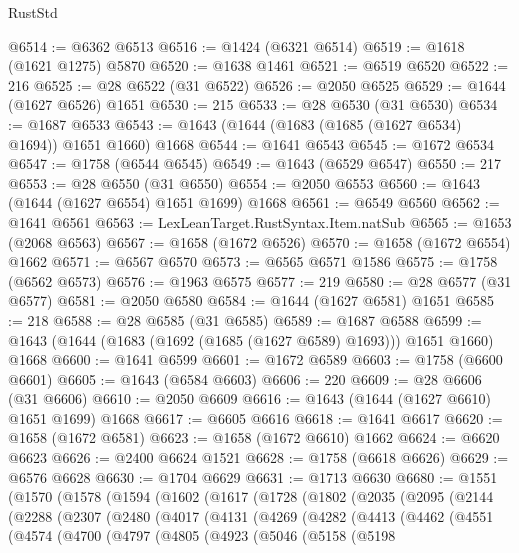 \begin{lexlean}{RustStd}
\begin{coremodule}
@6514 := @6362 @6513
@6516 := @1424 (@6321 @6514)
@6519 := @1618 (@1621 @1275) @5870
@6520 := @1638 @1461
@6521 := @6519 @6520
@6522 := 216
@6525 := @28 @6522 (@31 @6522)
@6526 := @2050 @6525
@6529 := @1644 (@1627 @6526) @1651
@6530 := 215
@6533 := @28 @6530 (@31 @6530)
@6534 := @1687 @6533
@6543 := @1643 (@1644 (@1683 (@1685 (@1627 @6534) @1694)) @1651 @1660) @1668
@6544 := @1641 @6543
@6545 := @1672 @6534
@6547 := @1758 (@6544 @6545)
@6549 := @1643 (@6529 @6547)
@6550 := 217
@6553 := @28 @6550 (@31 @6550)
@6554 := @2050 @6553
@6560 := @1643 (@1644 (@1627 @6554) @1651 @1699) @1668
@6561 := @6549 @6560
@6562 := @1641 @6561
@6563 := LexLeanTarget.RustSyntax.Item.natSub
@6565 := @1653 (@2068 @6563)
@6567 := @1658 (@1672 @6526)
@6570 := @1658 (@1672 @6554) @1662
@6571 := @6567 @6570
@6573 := @6565 @6571 @1586
@6575 := @1758 (@6562 @6573)
@6576 := @1963 @6575
@6577 := 219
@6580 := @28 @6577 (@31 @6577)
@6581 := @2050 @6580
@6584 := @1644 (@1627 @6581) @1651
@6585 := 218
@6588 := @28 @6585 (@31 @6585)
@6589 := @1687 @6588
@6599 := @1643 (@1644 (@1683 (@1692 (@1685 (@1627 @6589) @1693))) @1651 @1660) @1668
@6600 := @1641 @6599
@6601 := @1672 @6589
@6603 := @1758 (@6600 @6601)
@6605 := @1643 (@6584 @6603)
@6606 := 220
@6609 := @28 @6606 (@31 @6606)
@6610 := @2050 @6609
@6616 := @1643 (@1644 (@1627 @6610) @1651 @1699) @1668
@6617 := @6605 @6616
@6618 := @1641 @6617
@6620 := @1658 (@1672 @6581)
@6623 := @1658 (@1672 @6610) @1662
@6624 := @6620 @6623
@6626 := @2400 @6624 @1521
@6628 := @1758 (@6618 @6626)
@6629 := @6576 @6628
@6630 := @1704 @6629
@6631 := @1713 @6630
@6680 := @1551
    (@1570
      (@1578
        (@1594
          (@1602
            (@1617
              (@1728
                (@1802
                  (@2035
                    (@2095
                      (@2144
                        (@2288
                          (@2307
                            (@2480
                              (@4017
                                (@4131
                                  (@4269
                                    (@4282
                                      (@4413
                                        (@4462
                                          (@4551
                                            (@4574
                                              (@4700
                                                (@4797
                                                  (@4805
                                                    (@4923
                                                      (@5046
                                                        (@5158
                                                          (@5198

\end{coremodule}
\end{lexlean}
